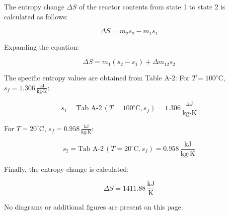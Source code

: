The entropy change \( \Delta S \) of the reactor contents from state 1 to state 2 is calculated as follows:  

\[
\Delta S = m_2 s_2 - m_1 s_1
\]

Expanding the equation:  

\[
\Delta S = m_1 (s_2 - s_1) + \Delta m_{12} s_2
\]

The specific entropy values are obtained from Table A-2:  
For \( T = 100^\circ\text{C} \), \( s_f = 1.306 \, \frac{\text{kJ}}{\text{kg·K}} \):  

\[
s_1 = \text{Tab A-2} \, (T = 100^\circ\text{C}, s_f) = 1.306 \, \frac{\text{kJ}}{\text{kg·K}}
\]

For \( T = 20^\circ\text{C} \), \( s_f = 0.958 \, \frac{\text{kJ}}{\text{kg·K}} \):  

\[
s_2 = \text{Tab A-2} \, (T = 20^\circ\text{C}, s_f) = 0.958 \, \frac{\text{kJ}}{\text{kg·K}}
\]

Finally, the entropy change is calculated:  

\[
\Delta S = 1411.88 \, \frac{\text{kJ}}{\text{K}}
\]  

No diagrams or additional figures are present on this page.